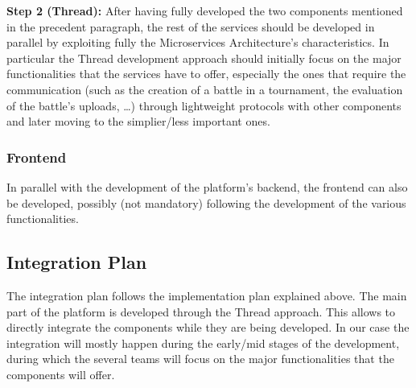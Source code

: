 \documentclass{article}
\begin{document}
{        \textbf{Step 2 (Thread):} After having fully developed the two components mentioned in the
        precedent paragraph, the rest of the services should be developed in parallel by exploiting 
        fully the Microservices Architecture's characteristics. In particular the Thread
        development approach should initially focus on the major functionalities that the services
        have to offer, especially the ones that require the communication (such as the creation
        of a battle in a tournament, the evaluation of the battle's uploads, \dots) through 
        lightweight protocols with other components and later moving to the simplier/less 
        important ones.

        \subsubsection{Frontend}
        In parallel with the development of the platform's backend, the frontend can also be
        developed, possibly (not mandatory) following the development of the various 
        functionalities.

    \subsection{Integration Plan}
        The integration plan follows the implementation plan explained above.
        The main part of the platform is developed through the Thread approach. This allows to
        directly integrate the components while they are being developed.
        In our case the integration will mostly happen during the early/mid stages
        of the development, during which the several teams will focus on the major functionalities
        that the components will offer.

}
\end{document}
